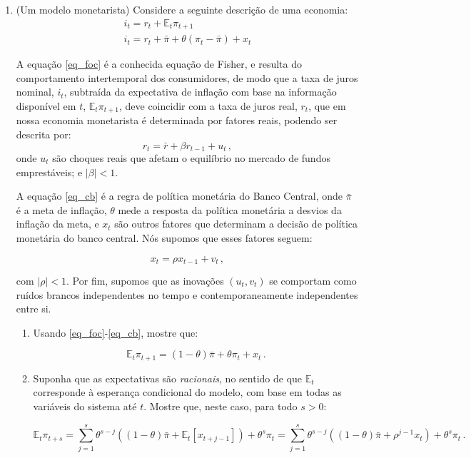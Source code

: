 \documentclass[10pt,a4paper]{article}
\begin{document}
\begin{enumerate}
\begin{enumerate}
	\end{enumerate}
\item (Um modelo monetarista) Considere a seguinte descrição de uma economia:
\begin{align}
	i_t = r_t +\mathbb{E}_t \pi_{t+1} \label{eq_foc} \\
	i_t = r_t + \bar\pi +  \theta (\pi_t - \bar{\pi}) + x_t  \label{eq_cb}
\end{align}

A equação \eqref{eq_foc} é a conhecida equação de Fisher, e resulta do comportamento intertemporal dos consumidores, de modo que a taxa de juros nominal, $i_t$, subtraída da expectativa de inflação com base na informação disponível em $t$, $\mathbb{E}_t \pi_{t+1}$, deve coincidir com a taxa de juros real, $r_t$, que em nossa economia monetarista é determinada por fatores reais, podendo ser descrita por:
\begin{equation}
r_t = \bar{r} + \beta r_{t-1} + u_t \, ,
\end{equation}
onde $u_t$ são choques reais que afetam o equilíbrio no mercado de fundos emprestáveis; e $|\beta| < 1$.

A equação \eqref{eq_cb} é a regra de política monetária do Banco Central, onde $\bar \pi$ é a meta de inflação, $\theta$ mede a resposta da política monetária a desvios da inflação da meta, e $x_t$ são outros fatores que determinam a decisão de política monetária do banco central. Nós supomos que esses fatores seguem:
 
 \begin{equation}
 	x_t =  \rho x_{t-1} + v_t \, ,
 \end{equation}
 
 com $|\rho| < 1$. Por fim, supomos que as inovações  $(u_t,v_t)$ se comportam como ruídos brancos independentes no tempo e contemporaneamente independentes entre si.

\begin{enumerate}
	\item Usando \eqref{eq_foc}-\eqref{eq_cb}, mostre que:
	
	$$\mathbb{E}_t \pi_{t+1} = (1-\theta)\bar{\pi} +\theta \pi_t + x_t\, . $$
	\item Suponha que as expectativas são \emph{racionais}, no sentido de que $\mathbb{E}_t$ corresponde à esperança condicional do modelo, com base em todas as variáveis do sistema até $t$. Mostre que, neste caso, para todo $s > 0$:
	
	$$\mathbb{E}_t \pi_{t+s}  = \sum_{j=1}^{s} \theta^{s- j}  ((1-\theta)\bar{\pi} + \mathbb{E}_t[x_{t+j-1}])  +  \theta^s \pi_t   = \sum_{j=1}^{s} \theta^{s-j}  ((1-\theta)\bar{\pi} +\rho^{j-1} x_{t})  +  \theta^s \pi_t \, .$$
	

\end{enumerate}
\end{enumerate}
\end{document}
